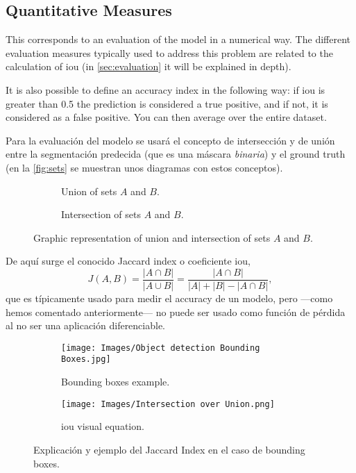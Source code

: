 \subsection{Quantitative Measures}

This corresponds to an evaluation of the model in a numerical way. The
different evaluation measures typically used to address this problem are
related to the calculation of \gls{iou} (in \vref{sec:evaluation} it will be
explained in depth).

It is also possible to define an accuracy index in the following way: if
\gls{iou} is greater than \num{0.5} the prediction is considered a true
positive, and if not, it is considered as a false positive. You can then
average over the entire dataset.

Para la evaluación del modelo se usará el concepto de intersección y de unión
entre la segmentación predecida (que es una máscara \emph{binaria}) y el ground
truth (en la \vref{fig:sets} se muestran unos diagramas con estos
conceptos).

\begin{figure}[htb]
  \begin{subfigure}[t]{.5\textwidth}
    \centering
    \caption{Union of sets \(A\) and \(B\).}
    
  \end{subfigure}
  \begin{subfigure}[t]{.5\textwidth}
    \centering
    \caption{Intersection of sets \(A\) and \(B\).}
    
  \end{subfigure}
  \caption[Union and intersection of sets \(A\) and \(B\)]{Graphic
    representation of union and intersection of sets \(A\) and \(B\).}
  \label{fig:sets}
\end{figure}

De aquí surge el conocido Jaccard index o coeficiente \gls{iou},
\begin{equation}
  J(A,B) = \frac{|A \cap B|}{|A \cup B|}
  = \frac{|A \cap B|}{|A| + |B| - |A \cap B|},
\end{equation}
que es típicamente usado para medir el accuracy de un modelo, pero ---como
hemos comentado anteriormente--- no puede ser usado como función de pérdida al
no ser una aplicación diferenciable.

\begin{figure}[htb]
  \begin{subfigure}[t]{.45\textwidth}
    \centering
    \caption{Bounding boxes example.}
    \texttt{[image: Images/Object detection Bounding Boxes.jpg]}
  \end{subfigure}\hfill
  \begin{subfigure}[t]{.45\textwidth}
    \centering
    \caption{\gls{iou} visual equation.}
    \texttt{[image: Images/Intersection over Union.png]}
  \end{subfigure}
  \caption[Explicación del Jaccard Index]{Explicación y ejemplo del Jaccard
    Index en el caso de bounding boxes.}
\end{figure}

